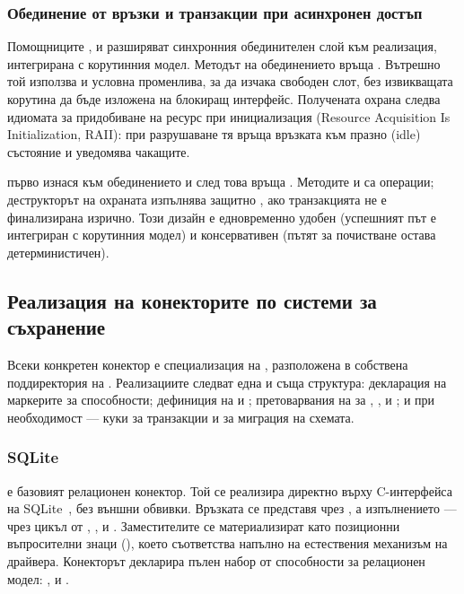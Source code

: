 \subsubsection{Обединение от връзки и транзакции при асинхронен достъп}

Помощниците ,  и  разширяват синхронния обединителен слой към реализация, интегрирана с корутинния модел. Методът  на обединението връща . Вътрешно той използва  и условна променлива, за да изчака свободен слот, без извикващата корутина да бъде изложена на блокиращ интерфейс. Получената охрана следва идиомата за придобиване на ресурс при инициализация (Resource Acquisition Is Initialization, RAII): при разрушаване тя връща връзката към празно (idle) състояние и уведомява чакащите.

 първо изнася  към обединението и след това връща . Методите  и  са  операции; деструкторът на охраната изпълнява защитно , ако транзакцията не е финализирана изрично. Този дизайн е едновременно удобен (успешният път е интегриран с корутинния модел) и консервативен (пътят за почистване остава детерминистичен).

\subsection{Реализация на конекторите по системи за съхранение}
\label{subsec:backends}

Всеки конкретен конектор е специализация на , разположена в собствена поддиректория на . Реализациите следват една и съща структура: декларация на маркерите за способности; дефиниция на  и ; претоварвания на  за , ,  и ; и при необходимост --- куки за транзакции и за миграция на схемата.

\subsubsection{SQLite}

 е базовият релационен конектор. Той се реализира директно върху C-интерфейса на SQLite~\cite{sqlite_api}, без външни обвивки. Връзката се представя чрез , а изпълнението --- чрез цикъл от , ,  и . Заместителите се материализират като позиционни въпросителни знаци (), което съответства напълно на естествения механизъм на драйвера. Конекторът декларира пълен набор от способности за релационен модел: ,  и .

